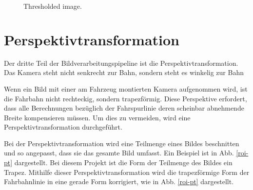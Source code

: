 \documentclass[arbeit=studie,oneside,BCOR=12mm]{ArbeitRST}
\begin{document}
\begin{figure}[h]
    \centering
    \caption{Thresholded image.}
    \label{color-thresholding}
\end{figure}

\section{Perspektivtransformation}

Der dritte Teil der Bildverarbeitungspipeline ist die Perspektivtransformation. 
Das Kamera steht nicht senkrecht zur Bahn, sondern steht es winkelig zur Bahn

Wenn ein Bild mit einer am Fahrzeug montierten Kamera aufgenommen wird, ist die
Fahrbahn nicht rechteckig, sondern trapezförmig. Diese Perspektive
erfordert, dass alle Berechnungen bezüglich der Fahrspurlinie deren scheinbar abnehmende
Breite kompensieren müssen. Um dies zu vermeiden, wird eine
Perspektivtransformation durchgeführt. 

Bei der Perspektivtransformation wird eine Teilmenge eines Bildes beschnitten
und so angepasst, dass sie das gesamte Bild umfasst. Ein Beispiel ist in
Abb. \ref{roi-pt} dargestellt. Bei diesem Projekt ist die Form der Teilmenge des Bildes
ein Trapez. Mithilfe dieser Perspektivtransformation wird die trapezförmige
Form der Fahrbahnlinie in eine gerade Form korrigiert, wie in Abb. \ref{roi-pt}
dargestellt. \\
\end{document}
